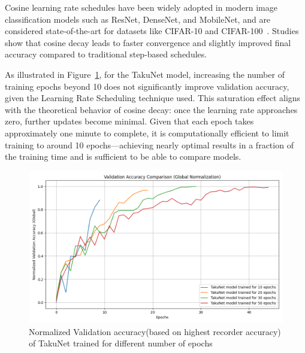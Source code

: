 Cosine learning rate schedules have been widely adopted in modern image classification models such as ResNet, DenseNet, and MobileNet, and are considered state-of-the-art for datasets like CIFAR-10 and CIFAR-100~\cite{lewkowycz2021decay}. Studies show that cosine decay leads to faster convergence and slightly improved final accuracy compared to traditional step-based schedules.

As illustrated in Figure~\ref{fig:val_accuracy_diff_epochs}, for the TakuNet model, increasing the number of training epochs beyond 10 does not significantly improve validation accuracy, given the Learning Rate Scheduling technique used. This saturation effect aligns with the theoretical behavior of cosine decay: once the learning rate approaches zero, further updates become minimal. Given that each epoch takes approximately one minute to complete, it is computationally efficient to limit training to around 10 epochs—achieving nearly optimal results in a fraction of the training time and is sufficient to be able to compare models.



\begin{figure}[ht]
    \centering
    \includegraphics[width=0.85\linewidth]{Pictures/val_accuracy_comparison_global.png}
    \caption{Normalized Validation accuracy(based on highest recorder accuracy) of TakuNet trained for different number of epochs }
    \label{fig:val_accuracy_diff_epochs}
\end{figure}